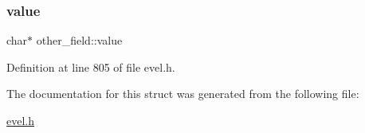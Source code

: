 \subsubsection{\texorpdfstring{value}{value}}
{\footnotesize\ttfamily char$\ast$ other\+\_\+field\+::value}



Definition at line 805 of file evel.\+h.



The documentation for this struct was generated from the following file\+:\begin{DoxyCompactItemize}
\item 
\hyperlink{evel_8h}{evel.\+h}\end{DoxyCompactItemize}
